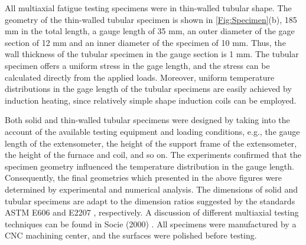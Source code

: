 All multiaxial fatigue testing specimens were in thin-walled tubular shape.
The geometry of the thin-walled tubular specimen is shown in \ref{Fig:Specimen}(b), 185 mm in the total length, a gauge length of 35 mm, an outer diameter of the gage section of 12 mm and an inner diameter of the specimen of 10 mm.
Thus, the wall thickness of the tubular specimen in the gauge section is 1 mm.
The tubular specimen offers a uniform stress in the gage length, and the stress can be calculated directly from the applied loads.
Moreover, uniform temperature distributions in the gage length of the tubular specimens are easily achieved by induction heating, since relatively simple shape induction coils can be employed.

Both solid and thin-walled tubular specimens were designed by taking into the account of the available testing equipment and loading conditions, e.g., the gauge length of the extensometer, the height of the support frame of the extensometer, the height of the furnace and coil, and so on.
The experiments confirmed that the specimen geometry influenced the temperature distribution in the gauge length.
Consequently, the final geometries which presented in the above figures were determined by experimental and numerical analysis.
The dimensions of solid and tubular specimens are adapt to the dimension ratios suggested by the standards ASTM E606 \cite{astm1998standard} and E2207 \cite{standard2007e2207}, respectively.
A discussion of different multiaxial testing techniques can be found in Socie (2000) \cite{socie2000multiaxial}.
All specimens were manufactured by a CNC machining center, and the surfaces were polished before testing.




